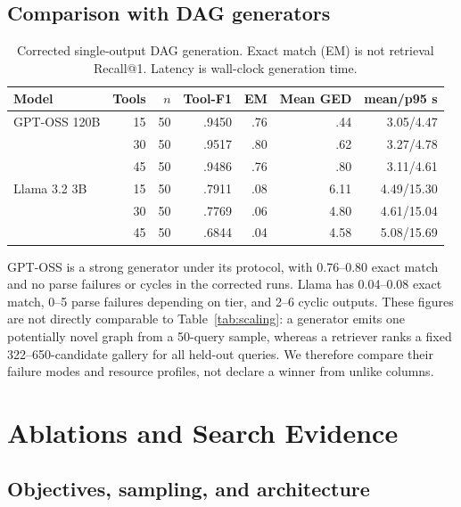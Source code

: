 \documentclass{article}
\begin{document}
\subsection{Comparison with DAG generators}

\begin{table}[t]
\caption{Corrected single-output DAG generation. Exact match (EM) is not retrieval Recall@1. Latency is wall-clock generation time.}
\label{tab:llm}
\centering
\scriptsize
\begin{tabular}{lrrrrrr}
\toprule
Model & Tools & $n$ & Tool-F1 & EM & Mean GED & mean/p95 s \\
\midrule
GPT-OSS 120B & 15 & 50 & .9450 & .76 & .44 & 3.05/4.47 \\
             & 30 & 50 & .9517 & .80 & .62 & 3.27/4.78 \\
             & 45 & 50 & .9486 & .76 & .80 & 3.11/4.61 \\
Llama 3.2 3B & 15 & 50 & .7911 & .08 & 6.11 & 4.49/15.30 \\
              & 30 & 50 & .7769 & .06 & 4.80 & 4.61/15.04 \\
              & 45 & 50 & .6844 & .04 & 4.58 & 5.08/15.69 \\
\bottomrule
\end{tabular}
\end{table}

GPT-OSS is a strong generator under its protocol, with 0.76--0.80 exact match and no parse failures or cycles in the corrected runs.
Llama has 0.04--0.08 exact match, 0--5 parse failures depending on tier, and 2--6 cyclic outputs.
These figures are not directly comparable to Table~\ref{tab:scaling}: a generator emits one potentially novel graph from a 50-query sample, whereas a retriever ranks a fixed 322--650-candidate gallery for all held-out queries.
We therefore compare their failure modes and resource profiles, not declare a winner from unlike columns.

\section{Ablations and Search Evidence}

\subsection{Objectives, sampling, and architecture}
\end{document}
